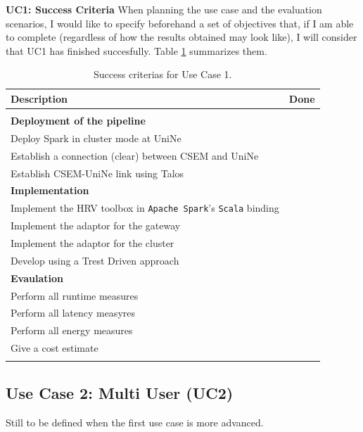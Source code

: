 \documentclass{article}
\newcommand{\lline}[1]{\hline\multicolumn{#1}{c}{}\\[-1.34em]\hline}
\begin{document}
\textbf{UC1: Success Criteria}
When planning the use case and the evaluation scenarios, I would like to specify beforehand a set of objectives that, if I am able to complete (regardless of how the results obtained may look like), I will consider that UC1 has finished succesfully. Table \ref{table:success-criteria-uc1} summarizes them.
    \begin{longtable}{p{10cm}l} \hline
        \textbf{Description} & \textbf{Done} \\[3pt] \lline{0}
        \textbf{Deployment of the pipeline} & \\[3pt] \hline
        Deploy Spark in cluster mode at UniNe & \\[3pt]
        Establish a connection (clear) between CSEM and UniNe & \\[3pt]
        Establish CSEM-UniNe link using Talos & \\[3pt] \hline
        \textbf{Implementation} & \\[3pt] \hline
        Implement the HRV toolbox in \texttt{Apache Spark}'s \texttt{Scala} binding & \\[3pt]
        Implement the adaptor for the gateway & \\[3pt]
        Implement the adaptor for the cluster & \\[3pt]
        Develop using a Trest Driven approach & \\[3pt] \hline
        \textbf{Evaulation} & \\[3pt] \hline
        Perform all runtime measures & \\[3pt]
        Perform all latency measyres & \\[3pt]
        Perform all energy measures & \\[3pt]
        Give a cost estimate & \\[3pt] \hline
    \caption{Success criterias for Use Case 1. \label{table:success-criteria-uc1}}
    \end{longtable}


\subsection{Use Case 2: Multi User (UC2)} \label{subsection:use-case-2}
Still to be defined when the first use case is more advanced.
\end{document}
